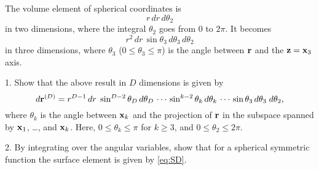 \documentclass[12pt]{book}
\begin{document}



The volume element of spherical coordinates is
\[
  r \, dr \, d\theta_2
\]
in two dimensions, where the integral $\theta_2$ goes from $0$ to $2\pi$.
%
It becomes
\[
  r^2 \, dr \,
  \sin \theta_3 \, d \theta_3 \,
  d \theta_2
\]
in three dimensions,
where $\theta_3$ ($0 \le \theta_3 \le \pi$)
is the angle between $\boldsymbol{\mathbf{r}}$ and the $\boldsymbol{\mathbf{z}} = \boldsymbol{\mathbf{x}}_3$ axis.

1. Show that the above result in $D$ dimensions is given by
\begin{equation}
  d\boldsymbol{\mathbf{r}}^{(D)}
=
  r^{D-1} \, dr \;
  \sin^{D-2} \theta_D \, d \theta_D \,
  \cdots \,
  \sin^{k-2} \theta_k \, d \theta_k \,
  \cdots \,
  \sin \theta_3 \, d \theta_3 \;
  d \theta_2,
  \label{eq:sphrcoordiff}
\end{equation}
where $\theta_k$ is the angle between $\boldsymbol{\mathbf{x}}_k$ and
the projection of $\boldsymbol{\mathbf{r}}$ in the subspace
spanned by $\boldsymbol{\mathbf{x}}_1$, \dots, and $\boldsymbol{\mathbf{x}}_k$.
Here, $0 \le \theta_k \le \pi$ for $k \ge 3$,
and $0 \le \theta_2 \le 2\pi$.


2. By integrating over the angular variables,
show that for a spherical symmetric function
the surface element is given by \eqref{eq:SD}.
\end{document}
